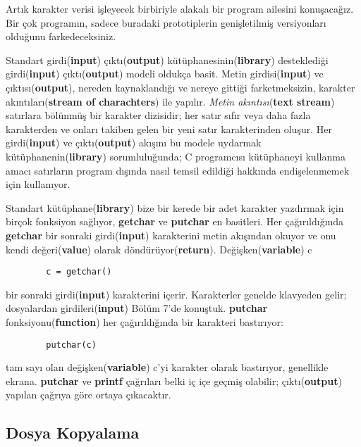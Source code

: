 \documentclass[a4paper,12pt,oneside]{book}
\begin{document}
Artık karakter verisi işleyecek birbiriyle alakalı bir program ailesini konuşacağız. Bir çok programın, sadece buradaki prototiplerin genişletilmiş versiyonları olduğunu farkedeceksiniz.
\par Standart girdi(\textbf{input}) çıktı(\textbf{output}) kütüphanesinin(\textbf{library}) desteklediği girdi(\textbf{input}) çıktı(\textbf{output}) modeli oldukça basit. Metin girdisi(\textbf{input}) ve çıktısı(\textbf{output}), nereden kaynaklandığı ve nereye gittiği farketmeksizin, karakter akıntıları(\textbf{stream of charachters}) ile yapılır. \textit{Metin akıntısı}(\textbf{text stream}) satırlara bölünmüş bir karakter dizisidir; her satır sıfır veya daha fazla karakterden ve onları takiben gelen bir yeni satır karakterinden oluşur. Her girdi(\textbf{input}) ve çıktı(\textbf{output}) akışını bu modele uydarmak kütüphanenin(\textbf{library}) sorumluluğunda; C programcısı kütüphaneyi kullanma amacı satırların program dışında nasıl temsil edildiği hakkında endişelenmemek için kullanıyor.
\par Standart kütüphane(\textbf{library}) bize bir kerede bir adet karakter yazdırmak için birçok fonksiyon sağlıyor, \textbf{getchar} ve \textbf{putchar} en basitleri. Her çağırıldığında \textbf{getchar} bir sonraki girdi(\textbf{input}) karakterini metin akışından okuyor ve onu kendi değeri(\textbf{value}) olarak döndürüyor(\textbf{return}). Değişken(\textbf{variable}) c
\begin{lstlisting}
		c = getchar()
\end{lstlisting}
bir sonraki girdi(\textbf{input}) karakterini içerir. Karakterler genelde klavyeden gelir; dosyalardan girdileri(\textbf{input}) Bölüm 7'de konuştuk.
\textbf{putchar} fonksiyonu(\textbf{function}) her çağırıldığında bir karakteri bastırıyor:
\begin{lstlisting}
		putchar(c)
\end{lstlisting}
tam sayı olan değişken(\textbf{variable}) c'yi karakter olarak bastırıyor, genellikle ekrana. \textbf{putchar} ve \textbf{printf} çağrıları belki iç içe geçmiş olabilir; çıktı(\textbf{output}) yapılan çağrıya göre ortaya çıkacaktır. \pagebreak

\subsection{Dosya Kopyalama}
\end{document}
